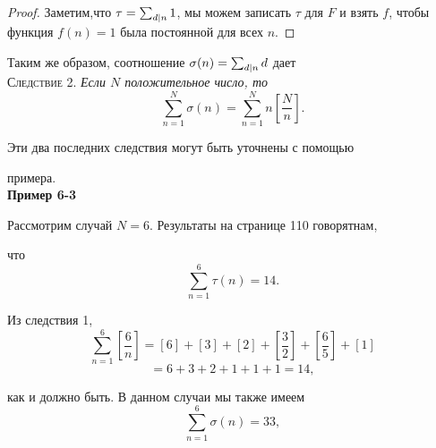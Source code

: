 \documentclass[11pt]{article}
\begin{document}
\begin{proof}
	Заметим,что $ \tau=\sum_{\tiny d|n}1 $, мы можем записать $ \tau $ для $ F $ и взять $ f $, чтобы функция $ f(n)=1 $ была постоянной для всех $ n $.
\end{proof}
Таким же образом, соотношение $ \sigma(n)=\sum_{\tiny d|n}d $ дает\\
\textsc{Следствие 2.}
\textit{Если $ N $ положительное число, то}
$$ \sum_{n=1}^{N}\sigma(n)=\sum_{n=1}^{N}n\left[\frac{N}{n}\right]. $$

Эти два последних следствия могут быть
уточнены с помощью 

примера. \vspace{12pt}\\
\textbf{Пример 6-3}

Рассмотрим случай $ N=6 $. Результаты на странице 110 говорятнам, 

что
$$ \sum_{n=1}^{6}\tau(n)=14. $$

Из следствия 1,
$$ \sum_{n=1}^{6}\left[ \frac{6}{n}\right]=\left[ 6\right] +\left[ 3\right] +\left[ 2\right] +\left[ \frac{3}{2}\right] +\left[ \frac{6}{5}\right] +\left[ 1\right] $$
$$=6+3+2+1+1+1=14, $$

как и должно быть. В данном случаи мы также имеем
$$ \sum_{n=1}^{6}\sigma(n)=33, $$
\end{document}
